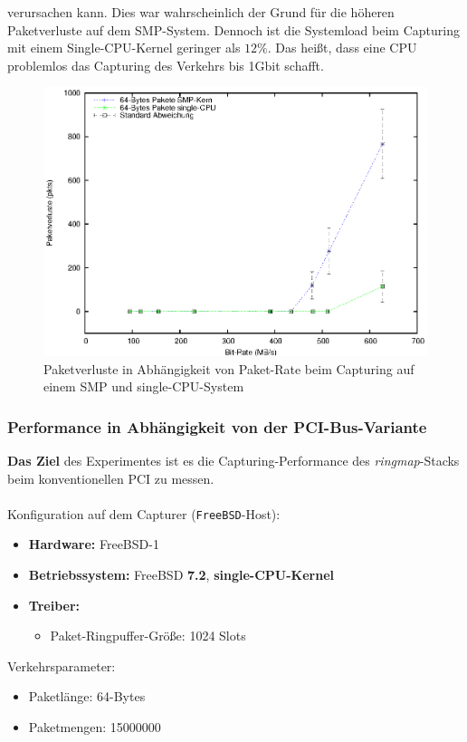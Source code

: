 {verursachen kann. Dies war wahrscheinlich der Grund für die höheren
Paketverluste auf dem SMP-System.  Dennoch ist die Systemload beim Capturing
mit einem Single-CPU-Kernel geringer als $12\%$. Das heißt, dass eine CPU
problemlos das Capturing des Verkehrs bis 1Gbit schafft.
\begin{figure} 
\centering \includegraphics[width=5.5in]{plots/graphs/pktloss_single_vs_SMP_PCIe_mbs}
\caption{Paketverluste in Abhängigkeit von Paket-Rate beim Capturing auf einem SMP und single-CPU-System}
\label{img:plot_pktlos_single_vs_smp_mbs}
\end{figure}

\subsubsection*{Performance in Abhängigkeit von der PCI-Bus-Variante}
\textbf{Das Ziel} des Experimentes ist es die Capturing-Performance des
\emph{ringmap}-Stacks beim konventionellen PCI zu messen.\\\\
%
Konfiguration auf dem Capturer (\verb+FreeBSD+-Host): 
\begin{itemize}
	\item \textbf{Hardware:} FreeBSD-1
	\item \textbf{Betriebssystem:} FreeBSD \textbf{7.2}, \textbf{single-CPU-Kernel}
	\item \textbf{Treiber:} 
		\begin{itemize}
			\item Paket-Ringpuffer-Größe: 1024 Slots
		\end{itemize}
\end{itemize}
Verkehrsparameter:
\begin{itemize}
	\item Paketlänge: 64-Bytes
	\item Paketmengen: 15000000
\end{itemize}
}

